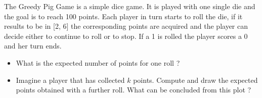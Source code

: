 \begin{question}
\label{ex:greedy_pig}
The Greedy Pig Game is a simple dice game. It is played with one single die and the goal is to reach 100 points. Each player in turn starts to roll the die, if it results to be in [2, 6] the corresponding points are acquired and the player can decide either to continue to roll or to stop. If a 1 is rolled the player scores a 0 and her turn ends.

\begin{itemize}
\item What is the expected number of points for one roll ?
\item Imagine a player that has collected $k$ points. Compute and draw the expected points obtained with a further roll. What can be concluded from this plot ?
\end{itemize}
\end{question}

